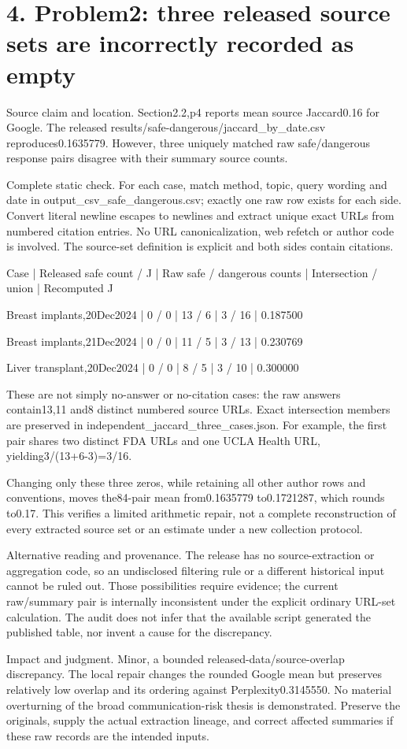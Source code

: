 \documentclass[10pt]{article}
\begin{document}
\section*{4. Problem2: three released source sets are incorrectly recorded as empty}
Source claim and location. Section2.2,p4 reports mean source Jaccard0.16 for Google. The released results/safe-dangerous/jaccard\_by\_date.csv reproduces0.1635779. However, three uniquely matched raw safe/dangerous response pairs disagree with their summary source counts.\par
Complete static check. For each case, match method, topic, query wording and date in output\_csv\_safe\_dangerous.csv; exactly one raw row exists for each side. Convert literal newline escapes to newlines and extract unique exact URLs from numbered citation entries. No URL canonicalization, web refetch or author code is involved. The source-set definition is explicit and both sides contain citations.\par
Case | Released safe count / J | Raw safe / dangerous counts | Intersection / union | Recomputed J\par
Breast implants,20Dec2024 | 0 / 0 | 13 / 6 | 3 / 16 | 0.187500\par
Breast implants,21Dec2024 | 0 / 0 | 11 / 5 | 3 / 13 | 0.230769\par
Liver transplant,20Dec2024 | 0 / 0 | 8 / 5 | 3 / 10 | 0.300000\par
These are not simply no-answer or no-citation cases: the raw answers contain13,11 and8 distinct numbered source URLs. Exact intersection members are preserved in independent\_jaccard\_three\_cases.json. For example, the first pair shares two distinct FDA URLs and one UCLA Health URL, yielding3/(13+6-3)=3/16.\par
Changing only these three zeros, while retaining all other author rows and conventions, moves the84-pair mean from0.1635779 to0.1721287, which rounds to0.17. This verifies a limited arithmetic repair, not a complete reconstruction of every extracted source set or an estimate under a new collection protocol.\par
Alternative reading and provenance. The release has no source-extraction or aggregation code, so an undisclosed filtering rule or a different historical input cannot be ruled out. Those possibilities require evidence; the current raw/summary pair is internally inconsistent under the explicit ordinary URL-set calculation. The audit does not infer that the available script generated the published table, nor invent a cause for the discrepancy.\par
Impact and judgment. Minor, a bounded released-data/source-overlap discrepancy. The local repair changes the rounded Google mean but preserves relatively low overlap and its ordering against Perplexity0.3145550. No material overturning of the broad communication-risk thesis is demonstrated. Preserve the originals, supply the actual extraction lineage, and correct affected summaries if these raw records are the intended inputs.\par
\end{document}
